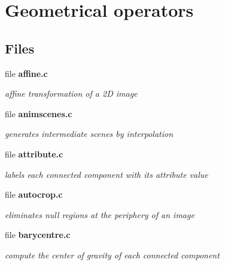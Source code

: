 \section{Geometrical operators}
\label{group__geo}
\subsection*{Files}
\begin{DoxyCompactItemize}
\item 
file {\bf affine.c}


\begin{DoxyCompactList}\small\item\em affine transformation of a 2D image \item\end{DoxyCompactList}

\item 
file {\bf animscenes.c}


\begin{DoxyCompactList}\small\item\em generates intermediate scenes by interpolation \item\end{DoxyCompactList}

\item 
file {\bf attribute.c}


\begin{DoxyCompactList}\small\item\em labels each connected component with its attribute value \item\end{DoxyCompactList}

\item 
file {\bf autocrop.c}


\begin{DoxyCompactList}\small\item\em eliminates null regions at the periphery of an image \item\end{DoxyCompactList}

\item 
file {\bf barycentre.c}


\begin{DoxyCompactList}\small\item\em compute the center of gravity of each connected component \item\end{DoxyCompactList}


\end{DoxyCompactItemize}
